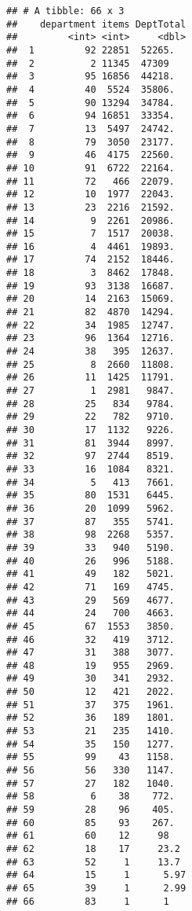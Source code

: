 \documentclass[]{article}
\newenvironment{Shaded}{\begin{snugshade}}{\end{snugshade}}
\newcommand{\StringTok}[1]{\textcolor[rgb]{0.31,0.60,0.02}{#1}}
\newcommand{\CommentTok}[1]{\textcolor[rgb]{0.56,0.35,0.01}{\textit{#1}}}
\newcommand{\OtherTok}[1]{\textcolor[rgb]{0.56,0.35,0.01}{#1}}
\newcommand{\NormalTok}[1]{#1}
\begin{document}
\begin{verbatim}
## # A tibble: 66 x 3
##    department items DeptTotal
##         <int> <int>     <dbl>
##  1         92 22851  52265.  
##  2          2 11345  47309   
##  3         95 16856  44218.  
##  4         40  5524  35806.  
##  5         90 13294  34784.  
##  6         94 16851  33354.  
##  7         13  5497  24742.  
##  8         79  3050  23177.  
##  9         46  4175  22560.  
## 10         91  6722  22164.  
## 11         72   466  22079.  
## 12         10  1977  22043.  
## 13         23  2216  21592.  
## 14          9  2261  20986.  
## 15          7  1517  20038.  
## 16          4  4461  19893.  
## 17         74  2152  18446.  
## 18          3  8462  17848.  
## 19         93  3138  16687.  
## 20         14  2163  15069.  
## 21         82  4870  14294.  
## 22         34  1985  12747.  
## 23         96  1364  12716.  
## 24         38   395  12637.  
## 25          8  2660  11808.  
## 26         11  1425  11791.  
## 27          1  2981   9847.  
## 28         25   834   9784.  
## 29         22   782   9710.  
## 30         17  1132   9226.  
## 31         81  3944   8997.  
## 32         97  2744   8519.  
## 33         16  1084   8321.  
## 34          5   413   7661.  
## 35         80  1531   6445.  
## 36         20  1099   5962.  
## 37         87   355   5741.  
## 38         98  2268   5357.  
## 39         33   940   5190.  
## 40         26   996   5188.  
## 41         49   182   5021.  
## 42         71   169   4745.  
## 43         29   569   4677.  
## 44         24   700   4663.  
## 45         67  1553   3850.  
## 46         32   419   3712.  
## 47         31   388   3077.  
## 48         19   955   2969.  
## 49         30   341   2932.  
## 50         12   421   2022.  
## 51         37   375   1961.  
## 52         36   189   1801.  
## 53         21   235   1410.  
## 54         35   150   1277.  
## 55         99    43   1158.  
## 56         56   330   1147.  
## 57         27   182   1040.  
## 58          6    38    772.  
## 59         28    96    405.  
## 60         85    93    267.  
## 61         60    12     98   
## 62         18    17     23.2 
## 63         52     1     13.7 
## 64         15     1      5.97
## 65         39     1      2.99
## 66         83     1      1
\end{verbatim}

\begin{Shaded}
\end{Shaded}
\end{document}
